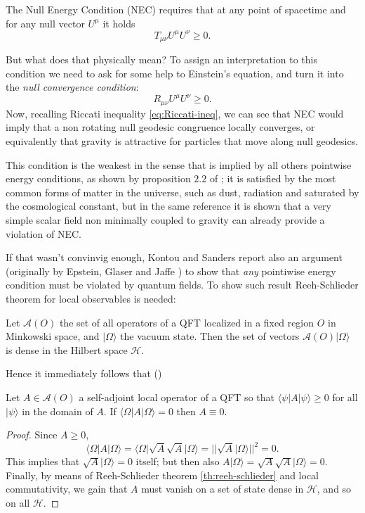 \begin{definition}
    \label{def:NEC}
    The Null Energy Condition (NEC) requires that at any point of spacetime and for any null vector \(U^{\mu}\) it holds
    \[
    T_{\mu\nu}U^{\mu}U^{\nu} \ge 0.
    \]
\end{definition}

But what does that physically mean? To assign an interpretation to this condition we need to ask for some help to Einstein's equation, and turn it into the \emph{null convergence condition}:
\[
    R_{\mu\nu}U^{\mu}U^{\nu} \ge 0. 
\]
Now, recalling Riccati inequality \eqref{eq:Riccati-ineq}, we can see that NEC would imply that a non rotating null geodesic congruence locally converges, or equivalently that gravity is attractive for particles that move along null geodesics.

This condition is the weakest in the sense that is implied by all others pointwise energy conditions, as shown by proposition \(2.2\) of \cite{kontou2020energy}; it is satisfied by the most common forms of matter in the universe, such as dust, radiation and saturated by the cosmological constant, but in the same reference \cite{kontou2020energy} it is shown that a very simple scalar field non minimally coupled to gravity can already provide a violation of NEC.

If that wasn't convinvig enough, Kontou and Sanders report also an argument (originally by Epstein, Glaser and Jaffe \cite{epstein1965nonpositivity}) to show that \emph{any} pointiwise energy condition must be violated by quantum fields. To show such result Reeh-Schlieder theorem for local observables is needed:
\begin{theorem}
    \label{th:reeh-schlieder}
    Let \(\mathcal{A}(O)\) the set of all operators of a QFT localized in a fixed region \(O\) in Minkowski space, and \(\vert \Omega \rangle\) the vacuum state. Then the set of vectors \(\mathcal{A}(O)\vert \Omega \rangle\) is dense in the Hilbert space \(\mathcal{H}\).
\end{theorem}

Hence it immediately follows that (\cite{epstein1965nonpositivity})
\begin{theorem}
    Let \(A\in \mathcal{A}(O)\) a self-adjoint local operator of a QFT so that \(\langle \psi\vert A\vert\psi\rangle\ge 0\) for all \(\vert\psi\rangle\) in the domain of \(A\). If \(\langle \Omega\vert A\vert\Omega\rangle = 0\) then \(A \equiv 0\).
\end{theorem}
\begin{proof}
    Since \(A\ge 0\), 
    \[
        \langle \Omega\vert A\vert\Omega\rangle = \langle \Omega\vert \sqrt{A}\sqrt{A}\vert\Omega\rangle = \vert\vert \sqrt{A}\vert\Omega\rangle\vert\vert^2 = 0.
    \] 
    This implies that \(\sqrt{A}\vert\Omega\rangle = 0\) itself; but then also \(A\vert\Omega\rangle = \sqrt{A}\sqrt{A}\vert\Omega\rangle = 0\). Finally, by means of Reeh-Schlieder theorem \ref{th:reeh-schlieder} and local commutativity, we gain that \(A\) must vanish on a set of state dense in \(\mathcal{H}\), and so on all \(\mathcal{H}\).
\end{proof}

